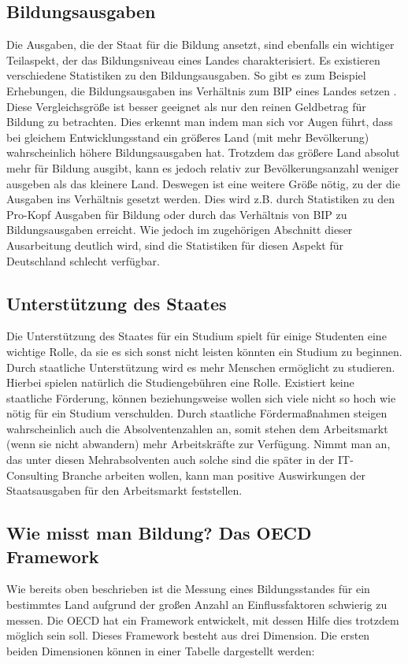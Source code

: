 \subsection*{Bildungsausgaben}
Die Ausgaben, die der Staat für die Bildung ansetzt, sind ebenfalls ein wichtiger Teilaspekt, der das Bildungsniveau eines Landes charakterisiert.
Es existieren verschiedene Statistiken zu den Bildungsausgaben. So gibt es zum Beispiel Erhebungen, die Bildungsausgaben ins Verhältnis zum BIP eines Landes setzen \cite[6]{oecd2} \cite{bip}. Diese Vergleichsgröße ist besser geeignet als nur den reinen Geldbetrag für Bildung zu betrachten. Dies erkennt man indem man sich vor Augen führt, dass bei gleichem Entwicklungsstand ein größeres Land (mit mehr Bevölkerung) wahrscheinlich höhere Bildungsausgaben hat. Trotzdem das größere Land absolut mehr für Bildung ausgibt, kann es jedoch relativ zur Bevölkerungsanzahl weniger ausgeben als das kleinere Land. Deswegen ist eine weitere Größe nötig, zu der die Ausgaben ins Verhältnis gesetzt werden. Dies wird z.B. durch Statistiken zu den Pro-Kopf Ausgaben für Bildung \cite[4]{oecd2} oder durch das Verhältnis von BIP zu Bildungsausgaben erreicht. Wie jedoch im zugehörigen Abschnitt dieser Ausarbeitung deutlich wird, sind die Statistiken für diesen Aspekt für Deutschland schlecht verfügbar.

\subsection*{Unterstützung des Staates} 
Die Unterstützung des Staates für ein Studium spielt für einige Studenten eine wichtige Rolle, da sie es sich sonst nicht leisten könnten ein Studium zu beginnen. Durch staatliche Unterstützung wird es mehr Menschen ermöglicht zu studieren. Hierbei spielen natürlich die Studiengebühren eine Rolle. Existiert keine staatliche Förderung, können beziehungsweise wollen sich viele nicht so hoch wie nötig für ein Studium verschulden. Durch staatliche Fördermaßnahmen steigen wahrscheinlich auch die Absolventenzahlen an, somit stehen dem Arbeitsmarkt (wenn sie nicht abwandern) mehr Arbeitskräfte zur Verfügung. Nimmt man an, das unter diesen Mehrabsolventen auch solche sind die später in der IT-Consulting Branche arbeiten wollen, kann man positive Auswirkungen der Staatsausgaben für den Arbeitsmarkt feststellen.

\subsection*{Wie misst man Bildung? Das OECD Framework}
Wie bereits oben beschrieben ist die Messung eines Bildungsstandes für ein bestimmtes Land aufgrund der großen Anzahl an Einflussfaktoren schwierig zu messen. Die OECD hat ein Framework entwickelt, mit dessen Hilfe dies trotzdem möglich sein soll. Dieses Framework besteht aus drei Dimension. Die ersten beiden Dimensionen können in einer Tabelle dargestellt werden:

